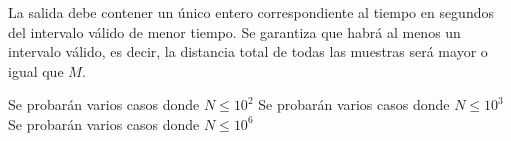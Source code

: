 \documentclass{oci}
\begin{document}
\begin{outputDescription}
  La salida debe contener un único entero correspondiente al tiempo en segundos
  del intervalo válido de menor tiempo.
  Se garantiza que habrá al menos un intervalo válido, es decir, la distancia
  total de todas las muestras será mayor o igual que $M$.
\end{outputDescription}

\begin{scoreDescription}
   Se probarán varios casos donde $N\leq 10^2$
   Se probarán varios casos donde $N\leq 10^3$
   Se probarán varios casos donde $N\leq 10^6$
\end{scoreDescription}

\begin{sampleDescription}
\end{sampleDescription}
\end{document}
